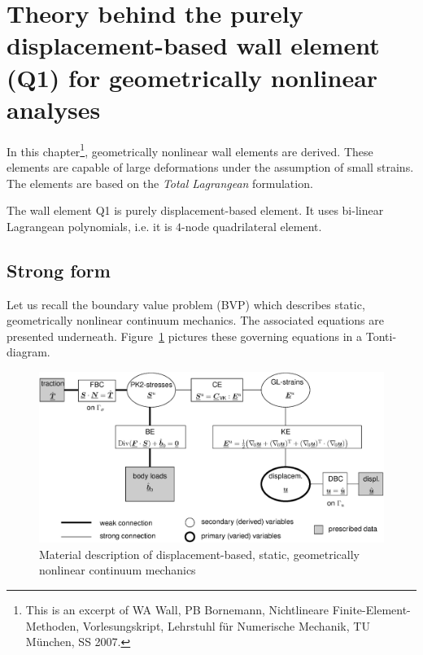 
\section{Theory behind the purely displacement-based wall element (Q1) for
geometrically nonlinear analyses}\label{wall1:sec:wall}

In this chapter\footnote{This is an excerpt of WA Wall,
PB Bornemann, Nichtlineare Finite-Element-Methoden, Vorlesungskript,
Lehrstuhl f\"{u}r Numerische Mechanik, TU M\"{u}nchen, SS 2007.},
geometrically nonlinear wall 
elements are derived. These elements are 
capable of large deformations under the assumption of small strains. The
elements are based on the \emph{Total Lagrangean} formulation.

The wall element Q1 is purely displacement-based element. It uses bi-linear
Lagrangean polynomials, i.e. it is $4$-node quadrilateral element.


\subsection{Strong form}
Let us recall the boundary value problem (BVP) which describes static,
geometrically nonlinear continuum mechanics. The associated equations are
presented underneath. Figure~\ref{wall1:fig:tonti-nonlin} pictures these governing equations in a Tonti-diagram.

\begin{figure}[H]
\begin{center}
\includegraphics[width=\linewidth]{eps/tonti_nonlinear_elasto_statics}
\end{center}
\caption{Material description of displacement-based, static, geometrically
  nonlinear continuum mechanics}
\label{wall1:fig:tonti-nonlin}
\end{figure}

